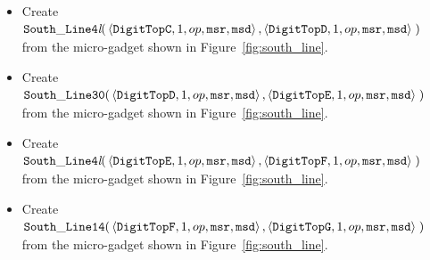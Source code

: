 \begin{itemize}
\begin{itemize}
            \item Create
            $\begin{aligned}[t]
                {\tt South\_Line4\textit{l}}(& \left\langle {\tt DigitTopC}, 1, op, {\tt msr}, {\tt msd}\right\rangle,
                                               \left\langle {\tt DigitTopD}, 1, op, {\tt msr}, {\tt msd}\right\rangle \;)
            \end{aligned}$\\from the micro-gadget shown in Figure~\ref{fig:south_line}.

            \item Create
            $\begin{aligned}[t]
                {\tt South\_Line30}(& \left\langle {\tt DigitTopD}, 1, op, {\tt msr}, {\tt msd}\right\rangle,
                                      \left\langle {\tt DigitTopE}, 1, op, {\tt msr}, {\tt msd}\right\rangle \;)
            \end{aligned}$\\from the micro-gadget shown in Figure~\ref{fig:south_line}.

            \item Create
            $\begin{aligned}[t]
                {\tt South\_Line4\textit{l}}(& \left\langle {\tt DigitTopE}, 1, op, {\tt msr}, {\tt msd}\right\rangle,
                                               \left\langle {\tt DigitTopF}, 1, op, {\tt msr}, {\tt msd}\right\rangle \;)
            \end{aligned}$\\ from the micro-gadget shown in Figure~\ref{fig:south_line}.

            \item Create
            $\begin{aligned}[t]
                {\tt South\_Line14}(& \left\langle {\tt DigitTopF}, 1, op, {\tt msr}, {\tt msd}\right\rangle,
                                      \left\langle {\tt DigitTopG}, 1, op, {\tt msr}, {\tt msd}\right\rangle \;)
            \end{aligned}$\\ from the micro-gadget shown in Figure~\ref{fig:south_line}.


\end{itemize}
\end{itemize}
